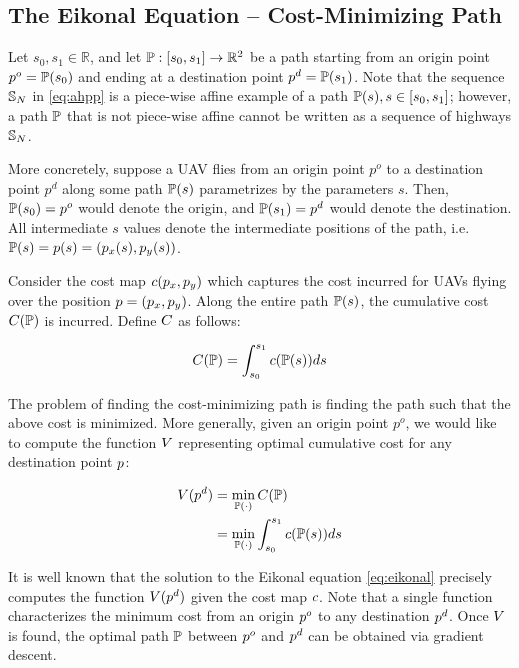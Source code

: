 \subsection{The Eikonal Equation -- Cost-Minimizing Path}
Let $s_0, s_1\in \mathbb{R}$, and let $\mathbb{P}: [s_0, s_1] \rightarrow \mathbb{R}^2$ be a path starting from an origin point $p^o = \mathbb{P}(s_0)$ and ending at a destination point $p^d = \mathbb{P}(s_1)$. Note that the sequence $\mathbb{S}_N$ in \eqref{eq:ahpp} is a piece-wise affine example of a path $\mathbb{P}(s), s\in[s_0, s_1]$; however, a path $\mathbb{P}$ that is not piece-wise affine cannot be written as a sequence of highways $\mathbb{S}_N$.

More concretely, suppose a UAV flies from an origin point $p^o$ to a destination point $p^d$ along some path $\mathbb{P}(s)$ parametrizes by the parameters $s$. Then, $\mathbb{P}(s_0) = p^o$ would denote the origin, and $\mathbb{P}(s_1) = p^d$ would denote the destination. All intermediate $s$ values denote the intermediate positions of the path, i.e. $\mathbb{P}(s) = p(s) = (p_x(s), p_y(s))$.

Consider the cost map $c(p_x, p_y)$ which captures the cost incurred for UAVs flying over the position $p = (p_x, p_y)$. Along the entire path $\mathbb{P}(s)$, the cumulative cost $C(\mathbb{P})$ is incurred. Define $C$ as follows:

\begin{equation}
C(\mathbb{P}) = \int_{s_0}^{s_1} c(\mathbb{P}(s)) ds
\end{equation}

The problem of finding the cost-minimizing path is finding the path such that the above cost is minimized. More generally, given an origin point $p^o$, we would like to compute the function $V$ representing optimal cumulative cost for any destination point $p$:

\begin{equation}
\label{eq:rahpp} %
\begin{aligned}
\ocost(\pos^d) &= \min_{\ppath(\cdot)} \ccost(\ppath) \\
&= \min_{\ppath(\cdot)} \int_{s_0}^{s_1} \cmap(\ppath(s)) ds
\end{aligned}
\end{equation}

It is well known \cite{} that the solution to the Eikonal equation \eqref{eq:eikonal} precisely computes the function $V(p^d)$ given the cost map $c$. Note that a single function characterizes the minimum cost from an origin $p^o$ to any destination $p^d$. Once $V$ is found, the optimal path $\mathbb{P}$ between $p^o$ and $p^d$ can be obtained via gradient descent.

